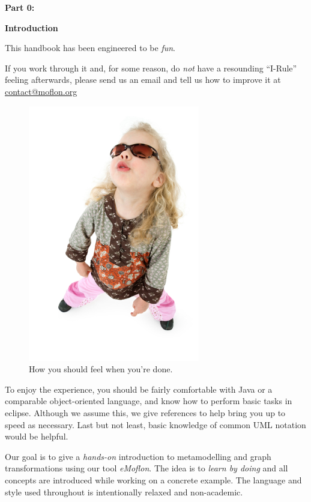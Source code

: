 \genHeader

{\bf \huge Part 0:}

\vspace{0.8cm}

{\bf \Huge Introduction }

\vspace{2cm}


This handbook has been engineered to be \emph{fun}.

If you work through it and, for some reason, do \emph{not} have a resounding \mbox{``I-Rule''} feeling afterwards, please send us an email and tell us how to
improve it at \href{mailto:contact@moflon.org}{contact@moflon.org}

\begin{figure}[htp]
\begin{center}
	\includegraphics[height=0.45\textheight]{../introduction_images/i-rule}
	\caption{How you should feel when you're done.}
	\label{i-rule}
\end{center}
\end{figure}
\break
 

To enjoy the experience, you should be fairly comfortable with Java or a comparable object-oriented language, and know how to perform basic tasks in eclipse. 
Although we assume this, we give references to help bring you up to speed as necessary. Last but not least, basic knowledge of common UML notation would be
helpful.

Our goal is to give a \emph{hands-on} introduction to metamodelling and graph transformations using our tool \emph{eMoflon}. The idea is to \emph{learn by
doing} and all concepts are introduced while working on a concrete example. The language and style used throughout is intentionally relaxed and non-academic.


